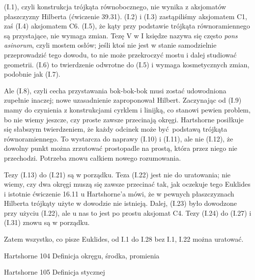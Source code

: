 (I.1), czyli konstrukcja trójkąta równobocznego, nie wynika z aksjomatów płaszczyzny Hilberta (ćwiczenie 39.31).
(I.2) i (I.3) zastąpiliśmy aksjomatem C1, zaś (I.4) aksjomatem C6.
(I.5), że kąty przy podstawie trójkąta równoramiennego są przystające, nie wymaga zmian.
Tezę V w I księdze nazywa się często \emph{pons asinorum}, czyli mostem osłów; jeśli ktoś nie jest w stanie samodzielnie przeprowadzić tego dowodu, to nie może przekroczyć mostu i dalej studiować geometrii.
%
%
(I.6) to twierdzenie odwrotne do (I.5) i wymaga kosmetycznych zmian, podobnie jak (I.7).

Ale (I.8), czyli cecha przystawania bok-bok-bok musi zostać udowodniona zupełnie inaczej; nowe uzasadnienie zaproponował Hilbert.
Zaczynając od (I.9) mamy do czynienia z konstrukcjami cyrklem i linijką, co stanowi pewien problem, bo nie wiemy jeszcze, czy proste zawsze przecinają okręgi.
Hartshorne posiłkuje się słabszym twierdzeniem, że każdy odcinek może być podstawą trójkąta równoramiennego.
To wystarcza do naprawy (I.10) i (I.11), ale nie (I.12), że dowolny punkt można zrzutować prostopadle na prostą, która przez niego nie przechodzi.
Potrzeba znowu całkiem nowego rozumowania.

Tezy (I.13) do (I.21) są w porządku.
Teza (I.22) jest nie do uratowania; nie wiemy, czy dwa okręgi muszą się zawsze przecinać tak, jak oczekuje tego Euklides i istotnie ćwiczenie 16.11 u Hartshorne'a mówi, że w pewnych płaszczyznach Hilberta trójkąty użyte w dowodzie nie istnieją.
Dalej, (I.23) było dowodzone przy użyciu (I.22), ale u nas to jest po prostu aksjomat C4.
Tezy (I.24) do (I.27) i (I.31) znowu są w porządku.

Zatem wszystko, co pisze Euklides, od I.1 do I.28 bez I.1, I.22 można uratować.

Hartshorne 104
Definicja okręgu, środka, promienia

Hartshorne 105
Definicja stycznej


